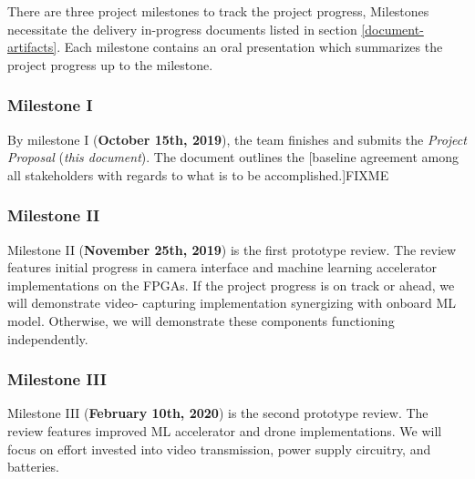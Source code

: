 There are three project milestones to track the project progress,
Milestones necessitate the delivery in-progress documents listed
in section \ref{document-artifacts}. Each milestone contains an oral
presentation which summarizes the project progress up to the milestone.

\subsubsection{Milestone I}
By milestone I (\textbf{October 15th, 2019}), the team finishes and submits
the \textit{Project Proposal} (\textit{this document}). The document outlines
the [baseline agreement among all stakeholders with 
regards to what is to be accomplished.]FIXME

\subsubsection{Milestone II}
Milestone II (\textbf{November 25th, 2019}) is the first prototype review. 
The review features initial progress in camera interface
and machine learning accelerator implementations on the FPGAs.
If the project progress is on track or ahead, we will demonstrate video-
capturing implementation synergizing with onboard ML model. Otherwise, we will
demonstrate these components functioning independently.

\subsubsection{Milestone III}
Milestone III (\textbf{February 10th, 2020}) is the second prototype review.
The review features improved ML accelerator and drone implementations. We will
focus on effort invested into video transmission, power supply circuitry, 
and batteries.